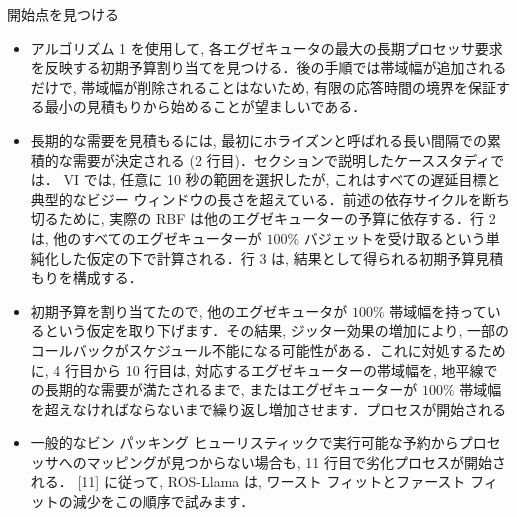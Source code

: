 \begin{frame}{開始点を見つける}
    \begin{itemize}
        \item アルゴリズム 1 を使用して, 各エグゼキュータの最大の長期プロセッサ要求を反映する初期予算割り当てを見つける．後の手順では帯域幅が追加されるだけで, 帯域幅が削除されることはないため, 有限の応答時間の境界を保証する最小の見積もりから始めることが望ましいである．
    \end{itemize}
\end{frame}

\begin{frame}{}
    \begin{itemize}
        \item 長期的な需要を見積もるには, 最初にホライズンと呼ばれる長い間隔での累積的な需要が決定される (2 行目)．セクションで説明したケーススタディでは． VI では, 任意に 10 秒の範囲を選択したが, これはすべての遅延目標と典型的なビジー ウィンドウの長さを超えている．前述の依存サイクルを断ち切るために, 実際の RBF は他のエグゼキューターの予算に依存する．行 2 は, 他のすべてのエグゼキューターが $100 \%$ バジェットを受け取るという単純化した仮定の下で計算される．行 3 は, 結果として得られる初期予算見積もりを構成する．
    \end{itemize}
\end{frame}

\begin{frame}{}
    \begin{itemize}
        \item 初期予算を割り当てたので, 他のエグゼキュータが $100 \%$ 帯域幅を持っているという仮定を取り下げます．その結果, ジッター効果の増加により, 一部のコールバックがスケジュール不能になる可能性がある．これに対処するために, 4 行目から 10 行目は, 対応するエグゼキューターの帯域幅を, 地平線での長期的な需要が満たされるまで, またはエグゼキューターが $100 \%$ 帯域幅を超えなければならないまで繰り返し増加させます．プロセスが開始される
    \end{itemize}
\end{frame}

\begin{frame}{}
    \begin{itemize}
        \item 一般的なビン パッキング ヒューリスティックで実行可能な予約からプロセッサへのマッピングが見つからない場合も, 11 行目で劣化プロセスが開始される． [11] に従って, ROS-Llama は, ワースト フィットとファースト フィットの減少をこの順序で試みます．
    \end{itemize}
\end{frame}

